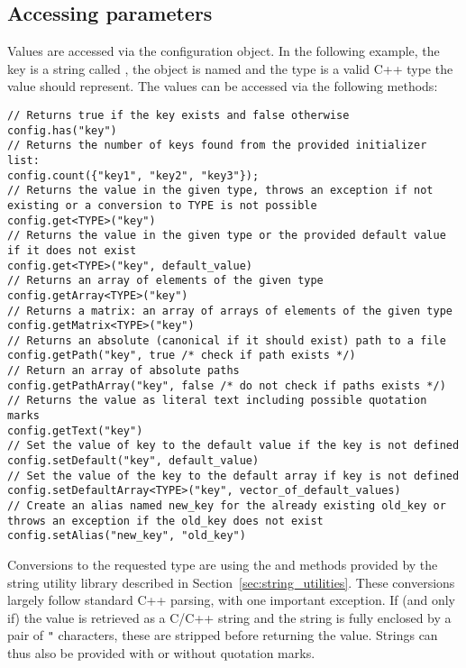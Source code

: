 \subsection{Accessing parameters}
\label{sec:accessing_parameters}
Values are accessed via the configuration object.
In the following example, the key is a string called , the object is named  and the type  is a valid C++ type the value should represent.
The values can be accessed via the following methods:
\begin{verbatim}
// Returns true if the key exists and false otherwise
config.has("key")
// Returns the number of keys found from the provided initializer list:
config.count({"key1", "key2", "key3"});
// Returns the value in the given type, throws an exception if not existing or a conversion to TYPE is not possible
config.get<TYPE>("key")
// Returns the value in the given type or the provided default value if it does not exist
config.get<TYPE>("key", default_value)
// Returns an array of elements of the given type
config.getArray<TYPE>("key")
// Returns a matrix: an array of arrays of elements of the given type
config.getMatrix<TYPE>("key")
// Returns an absolute (canonical if it should exist) path to a file
config.getPath("key", true /* check if path exists */)
// Return an array of absolute paths
config.getPathArray("key", false /* do not check if paths exists */)
// Returns the value as literal text including possible quotation marks
config.getText("key")
// Set the value of key to the default value if the key is not defined
config.setDefault("key", default_value)
// Set the value of the key to the default array if key is not defined
config.setDefaultArray<TYPE>("key", vector_of_default_values)
// Create an alias named new_key for the already existing old_key or throws an exception if the old_key does not exist
config.setAlias("new_key", "old_key")
\end{verbatim}

Conversions to the requested type are using the  and  methods provided by the string utility library described in Section~\ref{sec:string_utilities}.
These conversions largely follow standard C++ parsing, with one important exception.
If (and only if) the value is retrieved as a C/C++ string and the string is fully enclosed by a pair of \texttt{"} characters, these are stripped before returning the value.
Strings can thus also be provided with or without quotation marks.

